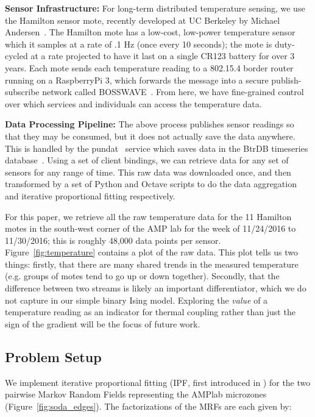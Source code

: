 \textbf{Sensor Infrastructure:} For long-term distributed temperature sensing, we use the Hamilton sensor mote, recently developed at UC Berkeley by Michael Andersen~\cite{hamiltonmote}.
The Hamilton mote has a low-cost, low-power temperature sensor which it samples at a rate of .1 Hz (once every 10 seconds); the mote is duty-cycled at a rate projected to have it last on a single CR123 battery for over 3 years.
Each mote sends each temperature reading to a 802.15.4 border router running on a RaspberryPi 3, which forwards the message into a secure publish-subscribe network called BOSSWAVE~\cite{andersen2016enabling}.
From here, we have fine-grained control over which services and individuals can access the temperature data.

\textbf{Data Processing Pipeline:} The above process publishes sensor readings so that they may be consumed, but it does not actually save the data anywhere.
This is handled by the pundat~\cite{pundat} service which saves data in the BtrDB timeseries database~\cite{andersen2016btrdb}.
Using a set of client bindings, we can retrieve data for any set of sensors for any range of time.
This raw data was downloaded once, and then transformed by a set of Python and Octave scripts to do the data aggregation and iterative proportional fitting respectively.

For this paper, we retrieve all the raw temperature data for the 11 Hamilton motes in the south-west corner of the AMP lab for the week of 11/24/2016 to 11/30/2016; this is roughly 48,000 data points per sensor.
Figure~\ref{fig:temperature} contains a plot of the raw data.
This plot tells us two things: firstly, that there are many shared trends in the measured temperature (e.g. groups of motes tend to go up or down together).
Secondly, that the difference between two streams is likely an important differentiator, which we do not capture in our simple binary Ising model.
Exploring the \emph{value} of a temperature reading as an indicator for thermal coupling rather than just the sign of the gradient will be the focus of future work.

\subsection{Problem Setup}

We implement iterative proportional fitting (IPF, first introduced in \cite{deming1940least}) for the two pairwise Markov Random Fields representing the AMPlab microzones (Figure~\ref{fig:soda_edges}).
The factorizations of the MRFs are each given by:

